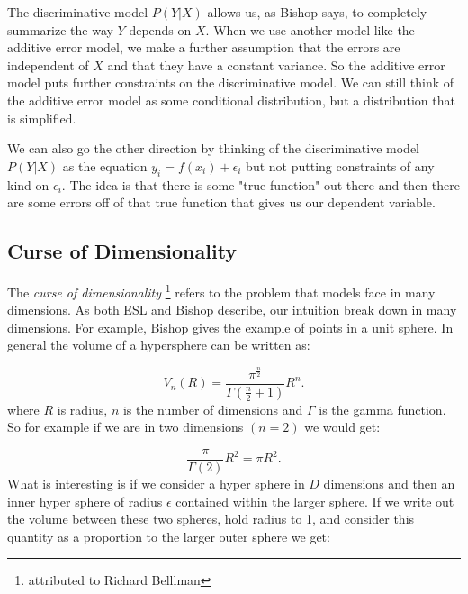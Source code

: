 
The discriminative model $P(Y|X)$ allows us, as Bishop says,  to completely summarize the way $Y$ depends on $X$. When we use another model like the additive error model, we make a further assumption that the errors are independent of $X$ and that they have a constant variance. So the additive error model puts further constraints on the discriminative model. We can still think of the additive error model as some conditional distribution, but a distribution that is simplified.

We can also go the other direction by thinking of the discriminative model $P(Y|X)$ as the equation $y_i = f(x_i) + \epsilon_i$ but not putting constraints of any kind on $\epsilon_i$. The idea is that there is some "true function" out there and then there are some errors off of that true function that gives us our dependent variable.



\subsection{Curse of Dimensionality} \label{sec:curse}

The \emph{curse of dimensionality}  \footnote{attributed to Richard Belllman} refers to the problem that models face in many dimensions. As both ESL and Bishop describe, our intuition break down in many dimensions. For example, Bishop gives the example of points in a unit sphere. In general the volume of a hypersphere can be written as:

\begin{equation}
V_n(R) = \frac{\pi^{\frac{n}{2}}}{\Gamma(\frac{n}{2} + 1)}R^n.
\end{equation}
where $R$ is radius, $n$ is the number of dimensions and $\Gamma$ is the \gls{gamma} function. So for example if we are in two dimensions $(n=2)$ we would get:

\begin{equation}
\frac{\pi}{\Gamma(2)}R^2 = \pi R^2.
\end{equation}
What is interesting is if we consider a hyper sphere in $D$ dimensions and then an inner hyper sphere of radius $\epsilon$ contained within the larger sphere. If we write out the volume between these two spheres, hold radius to 1, and consider this quantity as a proportion to the larger outer sphere we get:

